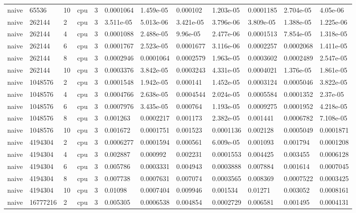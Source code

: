 \begin{tabular}{llllllllllll}
naive & 65536 & 10 & cpu & 3 & 0.0001064 & 1.459e-05 & 0.000102 & 1.203e-05 & 0.0001185 & 2.704e-05 & 4.05e-06 \\
naive & 262144 & 2 & cpu & 3 & 3.511e-05 & 5.013e-06 & 3.421e-05 & 3.796e-06 & 3.809e-05 & 1.388e-05 & 1.225e-06 \\
naive & 262144 & 4 & cpu & 3 & 0.0001088 & 2.488e-05 & 9.96e-05 & 2.477e-06 & 0.0001513 & 7.854e-05 & 1.318e-05 \\
naive & 262144 & 6 & cpu & 3 & 0.0001767 & 2.523e-05 & 0.0001677 & 3.116e-06 & 0.0002257 & 0.0002068 & 1.411e-05 \\
naive & 262144 & 8 & cpu & 3 & 0.0002946 & 0.0001064 & 0.0002579 & 1.963e-05 & 0.0003602 & 0.0002489 & 2.547e-05 \\
naive & 262144 & 10 & cpu & 3 & 0.0003376 & 3.842e-05 & 0.0003243 & 4.331e-05 & 0.0004021 & 1.376e-05 & 1.861e-05 \\
naive & 1048576 & 2 & cpu & 3 & 0.0001548 & 1.942e-05 & 0.000141 & 1.452e-05 & 0.0003124 & 0.0005046 & 3.822e-05 \\
naive & 1048576 & 4 & cpu & 3 & 0.0004766 & 2.638e-05 & 0.0004544 & 2.024e-05 & 0.0005584 & 0.0001352 & 2.37e-05 \\
naive & 1048576 & 6 & cpu & 3 & 0.0007976 & 3.435e-05 & 0.000764 & 1.193e-05 & 0.0009275 & 0.0001952 & 4.218e-05 \\
naive & 1048576 & 8 & cpu & 3 & 0.001263 & 0.0002217 & 0.001173 & 2.382e-05 & 0.001441 & 0.0006782 & 7.108e-05 \\
naive & 1048576 & 10 & cpu & 3 & 0.001672 & 0.0001751 & 0.001523 & 0.0001136 & 0.002128 & 0.0005049 & 0.0001871 \\
naive & 4194304 & 2 & cpu & 3 & 0.0006277 & 0.0001594 & 0.000561 & 6.009e-05 & 0.001093 & 0.001794 & 0.0001208 \\
naive & 4194304 & 4 & cpu & 3 & 0.002887 & 0.000992 & 0.002231 & 0.0001553 & 0.004425 & 0.003455 & 0.0006128 \\
naive & 4194304 & 6 & cpu & 3 & 0.005786 & 0.0003331 & 0.004943 & 0.0003888 & 0.007884 & 0.001614 & 0.0007045 \\
naive & 4194304 & 8 & cpu & 3 & 0.007738 & 0.0007631 & 0.007074 & 0.0003565 & 0.008369 & 0.0007522 & 0.0003425 \\
naive & 4194304 & 10 & cpu & 3 & 0.01098 & 0.0007404 & 0.009946 & 0.001534 & 0.01271 & 0.003052 & 0.0008161 \\
naive & 16777216 & 2 & cpu & 3 & 0.005305 & 0.0006538 & 0.004854 & 0.0002729 & 0.006581 & 0.001495 & 0.0004131 \\

\end{tabular}
